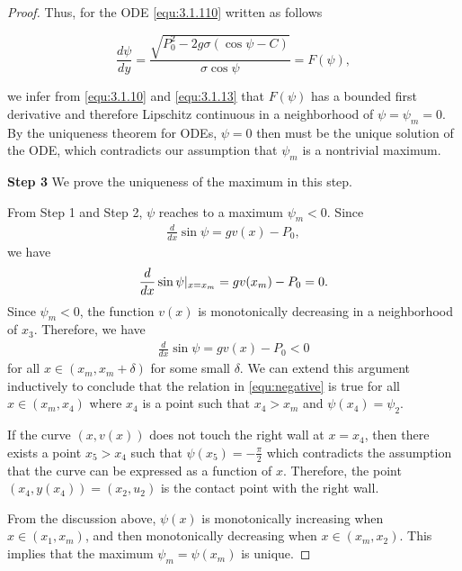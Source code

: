 \documentclass[10pt,a4paper]{amsart}
\begin{document}
\begin{proof}
      Thus, for the ODE \eqref{equ:3.1.110} written as follows

    \begin{equation*}
        \frac{d\psi}{dy}=\frac{\sqrt{P_{0}^{2}-2g\sigma(\cos\psi-C)}}{\sigma \cos\psi}=F(\psi),
    \end{equation*}

    \noindent we infer from \eqref{equ:3.1.10} and \eqref{equ:3.1.13} that $F(\psi)$ has a bounded first derivative and therefore Lipschitz continuous in a neighborhood of $\psi=\psi_m=0$. By the uniqueness theorem for ODEs,  $\psi=0$ then must be the unique solution of the ODE, which contradicts our assumption that $\psi_{m}$ is a nontrivial maximum.

    \textbf{Step 3} We prove the uniqueness of the maximum in this step. 
    
    From Step 1 and Step 2, $\psi$ reaches to a maximum $\psi_{m}<0$. Since
    \begin{align}
        \frac{d}{dx}\sin\psi=gv(x)-P_{0},
    \end{align}
    we have
    \begin{align}{\label{equ:negative}}
        \frac{d}{dx}\sin\psi|_{x=x_{m}}=gv(x_{m})-P_{0}=0.
    \end{align}
    \noindent Since $\psi_{m}<0$, the function $v(x)$ is monotonically decreasing in a neighborhood of $x_{3}$. Therefore, we have
    \begin{align}
        \frac{d}{dx}\sin\psi=gv(x)-P_{0}<0
    \end{align}
    for all $x\in (x_{m},x_{m}+\delta)$ for some small $\delta$. We can extend this argument inductively to conclude that the relation in \eqref{equ:negative} is true for all $x\in (x_{m},x_{4})$ where $x_{4}$ is a point such that $x_{4}>x_{m}$ and $\psi(x_{4})=\psi_{2}$. 
    
    If the curve $(x,v(x))$ does not touch the right wall at $x= x_{4}$, then there exists a point $x_{5}>x_{4}$ such that $\psi(x_{5})=-\frac{\pi}{2}$ which contradicts the assumption that the curve can be expressed as a function of $x$. Therefore, the point $(x_{4},y(x_{4}))=(x_{2},u_{2})$ is the contact point with the right wall. 

    From the discussion above, $\psi(x)$ is monotonically increasing when $x\in (x_{1},x_{m})$, and then monotonically decreasing when $x\in (x_{m},x_{2})$. This implies that the maximum $\psi_{m}=\psi(x_{m})$ is unique.
    
    \end{proof}
\end{document}
